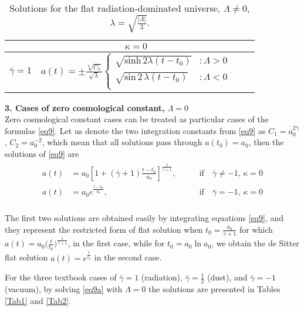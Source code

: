 \documentclass[
showkeys,
preprintnumbers,amsmath,amssymb,APS]{revtex4}
\begin{document}
\begin{table}[ht!]
\begin{center}
\begin{tabular}{|c|c|c|c|}
\hline  & $\kappa=0$  \\
\hline
\hline
$\bar\gamma=1$  &   $a(t) =\pm \frac{\sqrt[4]{C_1}}{\sqrt \lambda} \left\{
     \begin{array}{lr}
        \sqrt{\mathrm{sinh}\, 2\lambda(t-t_0)} & : \Lambda>0\\
        \sqrt{\mathrm{sin}\,2\, \lambda(t-t_0)} & : \Lambda<0\\
     \end{array}
   \right.$ \rule[0.5cm]{0cm}{0.2cm}\\
\hline
\end{tabular}
\end{center}
\caption{Solutions for the flat radiation-dominated universe, $\Lambda \ne 0$, $\lambda=\sqrt{\frac{|\Lambda|}{3}}$.}
\label{Tab7}
\end{table}


{\bf 3. Cases of zero cosmological constant, $\Lambda=0$}\\

Zero cosmological constant cases can be treated as particular cases of the formulas \eqref{eq9}. Let us denote the two integration constants from \eqref{eq9} as $C_1=a_0^{2 \bar \gamma}$, $C_2=a_0^{-2}$, which mean that all solutions pass through $a(t_0)=a_0$, then the solutions of \eqref{eq9} are
\begin{eqnarray}\label{eq10}
\begin{array}{lll}
a(t)&=a_0[1+(\bar \gamma+1)\frac{t-t_0}{a_0}]^{\frac{1}{\bar \gamma+1}}, \qquad &  \mathrm{if} \quad \bar{\gamma}\ne -1, \,  \kappa=0\\
a(t)&=a_0e^{\frac{t-t_0}{a_0}}, \qquad & \mathrm{if} \quad \bar{\gamma}= -1, \,  \kappa=0\\
\end{array}
\end{eqnarray}

The first two solutions are obtained easily by integrating equations \eqref{eq9}, and they represent the restricted form of flat solution  when $t_0=\frac{a_0}{\bar \gamma +1}$ for which $a(t)=a_0 \big(\frac{t}{t_0}\big)^{\frac{1}{\bar \gamma+1}}$, in the first case, while for $t_0=a_0 \ln a_0$, we obtain the de Sitter flat solution $a(t)=e^{\frac { t} {t_0}}$ in the second case.

For the three textbook cases of $\bar \gamma =1 $ (radiation), $\bar \gamma =\frac 1 2$ (dust), and $\bar \gamma =-1$ (vacuum), by solving \eqref{eq9a} with $\Lambda =0$ the solutions are presented in Tables \ref{Tab1} and  \ref{Tab2}.
\end{document}
